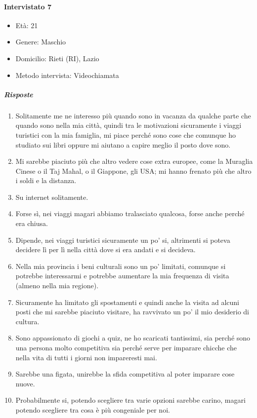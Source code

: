 \documentclass{article}
\begin{document}
\paragraph{Intervistato 7}
\begin{itemize}
\item Età: 21
\item Genere: Maschio
\item Domicilio: Rieti (RI), Lazio
\item Metodo intervista: Videochiamata
\end{itemize}
\subparagraph{Risposte}
\begin{enumerate}
\item Solitamente me ne interesso più quando sono in vacanza da qualche parte che quando sono nella mia città, quindi tra le motivazioni sicuramente i viaggi turistici con la mia famiglia, mi piace perché sono cose che comunque ho studiato sui libri oppure mi aiutano a capire meglio il posto dove sono.
\item Mi sarebbe piaciuto più che altro vedere cose extra europee, come la Muraglia Cinese o il Taj Mahal, o il Giappone, gli USA; mi hanno frenato più che altro i soldi e la distanza.
\item Su internet solitamente.
\item Forse sì, nei viaggi magari abbiamo tralasciato qualcosa, forse anche perché era chiusa.
\item Dipende, nei viaggi turistici sicuramente un po' si, altrimenti si poteva decidere lì per lì nella città dove si era andati e si decideva.
\item Nella mia provincia i beni culturali sono un po' limitati, comunque si potrebbe interessarmi e potrebbe aumentare la mia frequenza di visita (almeno nella mia regione).
\item Sicuramente ha limitato gli spostamenti e quindi anche la visita ad alcuni posti che mi sarebbe piaciuto visitare, ha ravvivato un po' il mio desiderio di cultura.
\item Sono appassionato di giochi a quiz, ne ho scaricati tantissimi, sia perché sono una persona molto competitiva sia perché serve per imparare chicche che nella vita di tutti i giorni non impareresti mai.
\item Sarebbe una figata, unirebbe la sfida competitiva al poter imparare cose nuove.
\item Probabilmente si, potendo scegliere tra varie opzioni sarebbe carino, magari potendo scegliere tra cosa è più congeniale per noi.
\end{enumerate}
\end{document}
